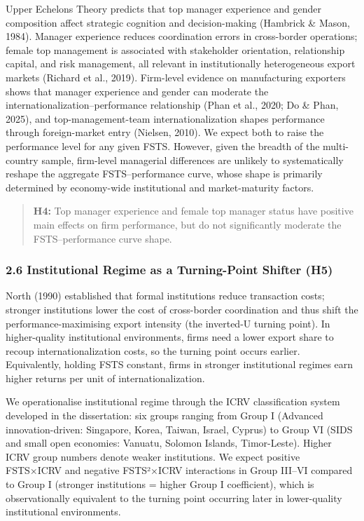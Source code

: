\documentclass[
  12pt,a4paper]{article}
\begin{document}
Upper Echelons Theory predicts that top manager experience and gender
composition affect strategic cognition and decision-making (Hambrick \&
Mason, 1984). Manager experience reduces coordination errors in
cross-border operations; female top management is associated with
stakeholder orientation, relationship capital, and risk management, all
relevant in institutionally heterogeneous export markets (Richard et
al., 2019). Firm-level evidence on manufacturing exporters shows that
manager experience and gender can moderate the
internationalization--performance relationship (Phan et al., 2020; Do \&
Phan, 2025), and top-management-team internationalization shapes
performance through foreign-market entry (Nielsen, 2010). We expect both
to raise the performance level for any given FSTS. However, given the
breadth of the multi-country sample, firm-level managerial differences
are unlikely to systematically reshape the aggregate FSTS--performance
curve, whose shape is primarily determined by economy-wide institutional
and market-maturity factors.

\begin{quote}
\textbf{H4:} Top manager experience and female top manager status have
positive main effects on firm performance, but do not significantly
moderate the FSTS--performance curve shape.
\end{quote}

\hypertarget{institutional-regime-as-a-turning-point-shifter-h5}{%
\subsubsection{2.6 Institutional Regime as a Turning-Point Shifter
(H5)}\label{institutional-regime-as-a-turning-point-shifter-h5}}

North (1990) established that formal institutions reduce transaction
costs; stronger institutions lower the cost of cross-border coordination
and thus shift the performance-maximising export intensity (the
inverted-U turning point). In higher-quality institutional environments,
firms need a lower export share to recoup internationalization costs, so
the turning point occurs earlier. Equivalently, holding FSTS constant,
firms in stronger institutional regimes earn higher returns per unit of
internationalization.

We operationalise institutional regime through the ICRV classification
system developed in the dissertation: six groups ranging from Group I
(Advanced innovation-driven: Singapore, Korea, Taiwan, Israel, Cyprus)
to Group VI (SIDS and small open economies: Vanuatu, Solomon Islands,
Timor-Leste). Higher ICRV group numbers denote weaker institutions. We
expect positive FSTS×ICRV and negative FSTS²×ICRV interactions in Group
III--VI compared to Group I (stronger institutions = higher Group I
coefficient), which is observationally equivalent to the turning point
occurring later in lower-quality institutional environments.
\end{document}

